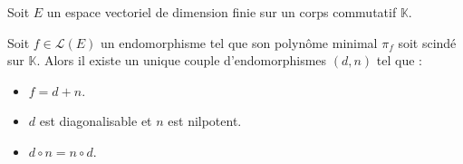 






  Soit $E$ un espace vectoriel de dimension finie sur un corps commutatif $\mathbb{K}$.

  \begin{theorem}
    Soit $f \in \mathcal{L}(E)$ un endomorphisme tel que son polynôme minimal $\pi_f$ soit scindé sur $\mathbb{K}$. Alors il existe un unique couple d'endomorphismes $(d, n)$ tel que :
    \begin{itemize}
      \item $f = d + n$.
      \item $d$ est diagonalisable et $n$ est nilpotent.
      \item $d \circ n = n \circ d$.
    \end{itemize}
  \end{theorem}

